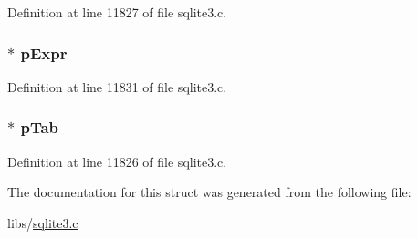 Definition at line 11827 of file sqlite3.\+c.

\hypertarget{struct_agg_info_1_1_agg_info__col_aab4193f0accd02e4c2e5e60e105c03ca}{}
\subsubsection[{p\+Expr}]{$\ast$ p\+Expr}\label{struct_agg_info_1_1_agg_info__col_aab4193f0accd02e4c2e5e60e105c03ca}


Definition at line 11831 of file sqlite3.\+c.

\hypertarget{struct_agg_info_1_1_agg_info__col_a11b1abc167f386db2ab7fc634c880c26}{}
\subsubsection[{p\+Tab}]{$\ast$ p\+Tab}\label{struct_agg_info_1_1_agg_info__col_a11b1abc167f386db2ab7fc634c880c26}


Definition at line 11826 of file sqlite3.\+c.



The documentation for this struct was generated from the following file\+:\begin{DoxyCompactItemize}
\item 
libs/\hyperlink{sqlite3_8c}{sqlite3.\+c}\end{DoxyCompactItemize}
